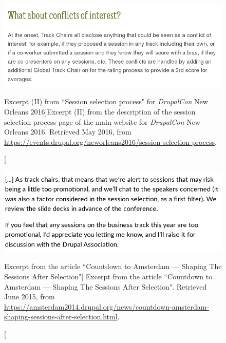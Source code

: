\begin{figure}[H]
\centering
\includegraphics[width=\textwidth]{img/quotes_replacement/session_selection_conflicts_interest_new_orleans_june_2016.png}
\caption[Excerpt (II) from ``Session selection process" for \textit{DrupalCon} New Orleans 2016]{Excerpt (II) from the description of the session selection process page of the main website for \textit{DrupalCon} New Orleans 2016. Retrieved  May 2016, from \url{https://events.drupal.org/neworleans2016/session-selection-process}.}
\label{dcon-new-orleans-sp02}
\end{figure}

\begin{figure}[H]
\centering
\includegraphics[scale=0.5]{img/quotes_replacement/dcon_amsterdam14_conflicts_interest.png}
\caption[Excerpt from the article ``Countdown to Amsterdam --- Shaping The Sessions After Selection"]%
{Excerpt from the article ``Countdown to Amsterdam --- Shaping The Sessions After Selection". Retrieved  June 2015, from \url{https://amsterdam2014.drupal.org/news/countdown-amsterdam-shaping-sessions-after-selection.html}.}
\label{promotional-talks-dcons}
\end{figure}


